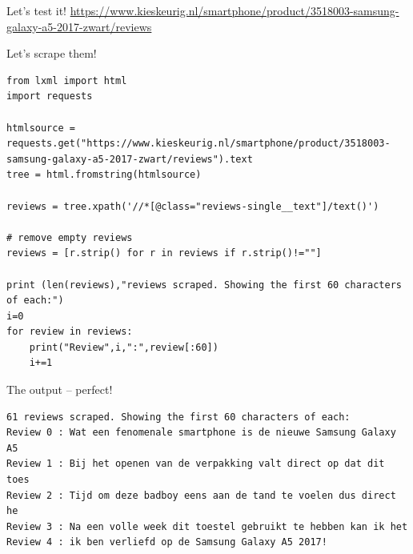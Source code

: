 \documentclass{beamer}
\begin{document}



\begin{frame}{Let's test it!}
	\large{\url{https://www.kieskeurig.nl/smartphone/product/3518003-samsung-galaxy-a5-2017-zwart/reviews}}
\end{frame}


\begin{frame}[fragile]{Let's scrape them!}
\begin{lstlisting}
from lxml import html
import requests

htmlsource = requests.get("https://www.kieskeurig.nl/smartphone/product/3518003-samsung-galaxy-a5-2017-zwart/reviews").text
tree = html.fromstring(htmlsource)        

reviews = tree.xpath('//*[@class="reviews-single__text"]/text()')

# remove empty reviews
reviews = [r.strip() for r in reviews if r.strip()!=""]

print (len(reviews),"reviews scraped. Showing the first 60 characters of each:")
i=0
for review in reviews:
    print("Review",i,":",review[:60])
    i+=1
\end{lstlisting}
\end{frame}



\begin{frame}[fragile]{The output -- perfect!}
\begin{lstlisting}
61 reviews scraped. Showing the first 60 characters of each:
Review 0 : Wat een fenomenale smartphone is de nieuwe Samsung Galaxy A5
Review 1 : Bij het openen van de verpakking valt direct op dat dit toes
Review 2 : Tijd om deze badboy eens aan de tand te voelen dus direct he
Review 3 : Na een volle week dit toestel gebruikt te hebben kan ik het 
Review 4 : ik ben verliefd op de Samsung Galaxy A5 2017!

\end{lstlisting}
\end{frame}
\end{document}
